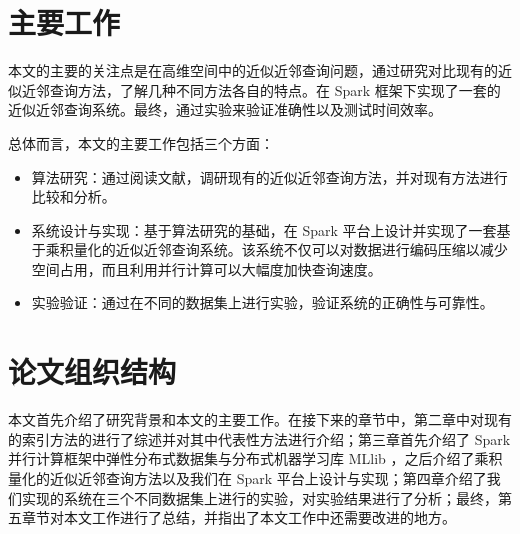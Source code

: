 \section{主要工作}
本文的主要的关注点是在高维空间中的近似近邻查询问题，通过研究对比现有的近似近邻查询方法，了解几种不同方法各自的特点。在 Spark 框架下实现了一套的近似近邻查询系统。最终，通过实验来验证准确性以及测试时间效率。

总体而言，本文的主要工作包括三个方面：
\begin{itemize}
\item 算法研究：通过阅读文献，调研现有的近似近邻查询方法，并对现有方法进行比较和分析。
\item 系统设计与实现：基于算法研究的基础，在 Spark 平台上设计并实现了一套基于乘积量化的近似近邻查询系统。该系统不仅可以对数据进行编码压缩以减少空间占用，而且利用并行计算可以大幅度加快查询速度。
\item 实验验证：通过在不同的数据集上进行实验，验证系统的正确性与可靠性。
\end{itemize}

\section{论文组织结构}
本文首先介绍了研究背景和本文的主要工作。在接下来的章节中，第二章中对现有的索引方法的进行了综述并对其中代表性方法进行介绍；第三章首先介绍了 Spark 并行计算框架中弹性分布式数据集与分布式机器学习库 MLlib ，之后介绍了乘积量化的近似近邻查询方法以及我们在 Spark 平台上设计与实现；第四章介绍了我们实现的系统在三个不同数据集上进行的实验，对实验结果进行了分析；最终，第五章节对本文工作进行了总结，并指出了本文工作中还需要改进的地方。
